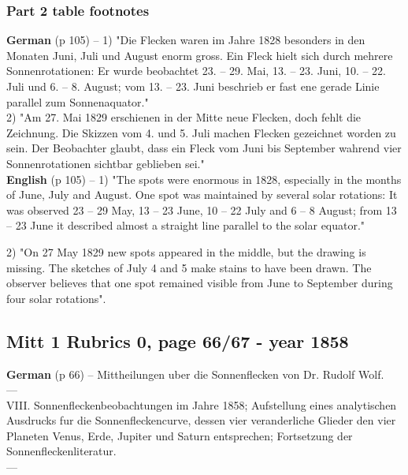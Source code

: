 \documentclass[12pt]{article}
\begin{document}
\subsubsection{Part 2 table footnotes}\label{mitt:rub 684 part 2 table footnotes}
\textbf{German} (p 105) -- 
1) "Die Flecken waren im Jahre 1828 besonders in den Monaten Juni, Juli und August enorm gross. Ein Fleck hielt sich durch mehrere Sonnenrotationen: Er wurde beobachtet 23. -- 29. Mai, 13. -- 23. Juni, 10. -- 22. Juli und 6. -- 8. August; vom 13. -- 23. Juni beschrieb er fast ene gerade Linie parallel zum Sonnenaquator."\\

2) "Am 27. Mai 1829 erschienen in der Mitte neue Flecken, doch fehlt die Zeichnung. Die Skizzen vom 4. und 5. Juli machen Flecken gezeichnet worden zu sein. Der Beobachter glaubt, dass ein Fleck vom Juni bis September wahrend vier Sonnenrotationen sichtbar geblieben sei."\\

\textbf{English} (p 105) -- 
1) "The spots were enormous in 1828, especially in the months of June, July and August. One spot was maintained by several solar rotations: It was observed 23 -- 29 May, 13 -- 23 June, 10 -- 22 July and 6 -- 8 August; from 13 -- 23 June it described almost a straight line parallel to the solar equator."

2) "On 27 May 1829 new spots appeared in the middle, but the drawing is missing. The sketches of July 4 and 5 make stains to have been drawn. The observer believes that one spot remained visible from June to September during four solar rotations".

\subsection{Mitt 1 Rubrics 0, page 66/67 - year 1858}\label{mitt:rub 0 R. Wolf 1858}
\textbf{German} (p 66) -- 
Mittheilungen uber die Sonnenflecken von Dr. Rudolf Wolf.\\
---\\
VIII. Sonnenfleckenbeobachtungen im Jahre 1858; Aufstellung eines analytischen Ausdrucks fur die Sonnenfleckencurve, dessen vier veranderliche Glieder den vier Planeten Venus, Erde, Jupiter und Saturn entsprechen; Fortsetzung der Sonnenfleckenliteratur.\\
---\\
\end{document}
